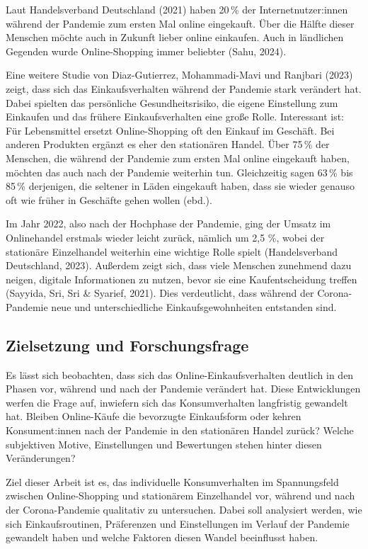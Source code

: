 Laut Handelsverband Deutschland (2021) haben 20 \% der Internetnutzer:innen während der Pandemie zum ersten Mal online eingekauft. Über die Hälfte dieser Menschen möchte auch in Zukunft lieber online einkaufen. Auch in ländlichen Gegenden wurde Online-Shopping immer beliebter (Sahu, 2024). 

Eine weitere Studie von Diaz-Gutierrez, Mohammadi-Mavi und Ranjbari (2023) zeigt, dass sich das Einkaufsverhalten während der Pandemie stark verändert hat. Dabei spielten das persönliche Gesundheitsrisiko, die eigene Einstellung zum Einkaufen und das frühere Einkaufsverhalten eine große Rolle. Interessant ist: Für Lebensmittel ersetzt Online-Shopping oft den Einkauf im Geschäft. Bei anderen Produkten ergänzt es eher den stationären Handel. Über 75 \% der Menschen, die während der Pandemie zum ersten Mal online eingekauft haben, möchten das auch nach der Pandemie weiterhin tun. Gleichzeitig sagen 63 \% bis 85 \% derjenigen, die seltener in Läden eingekauft haben, dass sie wieder genauso oft wie früher in Geschäfte gehen wollen (ebd.). 

Im Jahr 2022, also nach der Hochphase der Pandemie, ging der Umsatz im Onlinehandel erstmals wieder leicht zurück, nämlich um 2,5 \%, wobei der stationäre Einzelhandel weiterhin eine wichtige Rolle spielt (Handelsverband Deutschland, 2023). Außerdem zeigt sich, dass viele Menschen zunehmend dazu neigen, digitale Informationen zu nutzen, bevor sie eine Kaufentscheidung treffen (Sayyida, Sri, Sri \& Syarief, 2021). Dies verdeutlicht, dass während der Corona-Pandemie neue und unterschiedliche Einkaufsgewohnheiten entstanden sind. 

\subsection{Zielsetzung und Forschungsfrage}
Es lässt sich beobachten, dass sich das Online-Einkaufsverhalten deutlich in den Phasen vor, während und nach der Pandemie verändert hat. Diese Entwicklungen werfen die Frage auf, inwiefern sich das Konsumverhalten langfristig gewandelt hat. Bleiben Online-Käufe die bevorzugte Einkaufsform oder kehren Konsument:innen nach der Pandemie in den stationären Handel zurück? Welche subjektiven Motive, Einstellungen und Bewertungen stehen hinter diesen Veränderungen? 

Ziel dieser Arbeit ist es, das individuelle Konsumverhalten im Spannungsfeld zwischen Online-Shopping und stationärem Einzelhandel vor, während und nach der Corona-Pandemie qualitativ zu untersuchen. Dabei soll analysiert werden, wie sich Einkaufsroutinen, Präferenzen und Einstellungen im Verlauf der Pandemie gewandelt haben und welche Faktoren diesen Wandel beeinflusst haben. 

